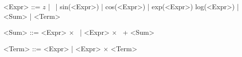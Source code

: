 \setlength{\grammarindent}{5em}
\begin{grammar}
	<Expr> ::= $z$ | \CC\ | sin(<Expr>) | cos(<Expr>) | exp(<Expr>)
	\alt log(<Expr>) | <Sum> | <Term>

	<Sum> ::= <Expr> $\times$ \CC\ | <Expr> $\times$ \CC\ + <Sum>

	<Term> ::= <Expr> \textsuperscript{\CC} | <Expr> \textsuperscript{\CC}  $\times$ <Term>
\end{grammar}
